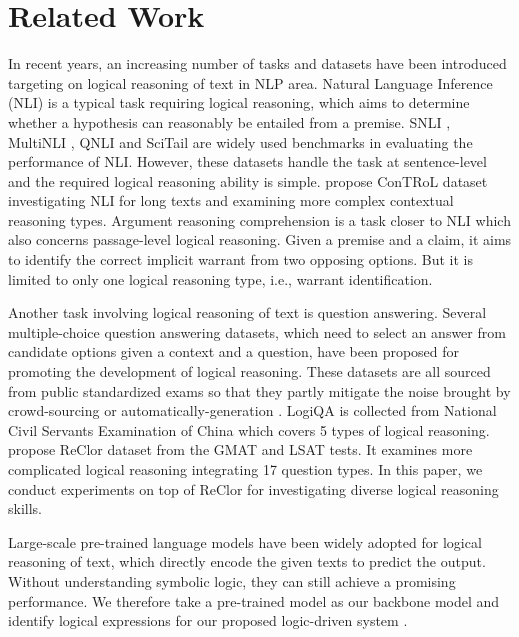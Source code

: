 \documentclass[11pt,a4paper]{article}
\begin{document}
\section{Related Work}
In recent years, an increasing number of tasks and datasets have been introduced targeting on logical reasoning of text in NLP area. Natural Language Inference (NLI) \cite{dagan2005pascal} is a typical task requiring logical reasoning, which aims to determine 
whether a hypothesis can reasonably be entailed from a premise. SNLI \cite{bowman2015large}, MultiNLI \cite{williams2018broad}, QNLI \cite{wang2018glue} and SciTail \cite{khot2018scitail} 
are widely used benchmarks in evaluating the performance of NLI. However, these datasets handle the task at sentence-level and the required logical reasoning ability is simple. \citet{liu2020natural} propose ConTRoL dataset investigating NLI for long texts and examining more complex contextual reasoning types. Argument reasoning comprehension \cite{habernal2018argument} is a task closer to NLI which also concerns passage-level logical reasoning. Given a premise and a claim, it aims to identify the correct implicit warrant from two opposing options. But it is limited to only one logical reasoning type, i.e., warrant identification. 

Another task involving logical reasoning of text is question answering. Several multiple-choice question answering datasets, which need to select an answer from candidate options given a context and a question, have been proposed for promoting the development of logical reasoning. These datasets are all sourced from public standardized exams so that they partly mitigate the noise brought by crowd-sourcing or automatically-generation \cite{lai2017race}. LogiQA \cite{liu2020logiqa} is collected from National Civil Servants Examination of China which covers 5 types of logical reasoning. \citet{yu2020reclor} propose ReClor dataset from the GMAT and LSAT tests. It examines more complicated logical reasoning integrating 17 question types. In this paper, we conduct experiments on top of ReClor for investigating diverse logical reasoning skills. 

Large-scale pre-trained language models \cite{devlin2019bert, liu2019roberta, yang2019xlnet, lan2019albert} have been widely adopted for logical reasoning of text, which directly encode the given texts to predict the output. Without understanding symbolic logic, they can still achieve a promising performance. We therefore take a pre-trained model as our backbone model and identify logical expressions for our proposed logic-driven system .
\end{document}
